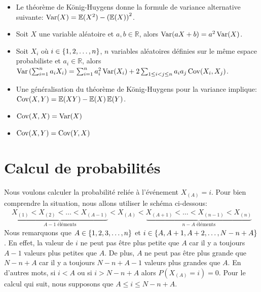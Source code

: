 \documentclass[10pt]{article}
\begin{document}
\begin{itemize}
\item
  Le théorème de König-Huygens donne la formule de variance alternative
  suivante: \(\operatorname{Var}(X)=\operatorname{\mathbb{E}}(X^2)-\left(\operatorname{\mathbb{E}}(X)\right)^2\).
\item
  Soit \(X\) une variable aléatoire et \(a,b\in\mathbb{R}\), alors
  \(\operatorname{Var}(aX+b)=a^2\operatorname{Var}(X)\).
\item
  Soit \(X_i\) où \(i\in\left\{1,2,\ldots,n\right\}\), \(n\) variables aléatoires
  définies sur le même espace probabiliste et \(a_i\in\mathbb{R}\),
  alors
  \(\operatorname{Var}\left(\sum_{i=1}^n a_iX_i\right)=\sum_{i=1}^n a_i^2\operatorname{Var}(X_i)+2\sum_{1\leq i< j\leq n} a_ia_j\operatorname{Cov}(X_i,X_j)\).
\item
  Une généralisation du théorème de König-Huygens pour la variance
  implique: \(\operatorname{Cov}(X,Y)=\operatorname{\mathbb{E}}(XY)-\operatorname{\mathbb{E}}(X)\operatorname{\mathbb{E}}(Y)\).
\item
  \(\operatorname{Cov}(X,X)=\operatorname{Var}(X)\)
\item
  \(\operatorname{Cov}(X,Y)=\operatorname{Cov}(Y,X)\)
\end{itemize}

\hypertarget{calcul-de-probabilites}{%
\section{\texorpdfstring{Calcul de probabilités
\label{calculs_proba}}{Calcul de probabilités }}\label{calcul-de-probabilites}}

Nous voulons calculer la probabilité reliée à l'événement \(X_{(A)}=i\).
Pour bien comprendre la situation, nous allons utiliser le schéma
ci-dessous: \begin{align*}
\underbrace{X_{(1)} <  X_{(2)} < \ldots < X_{(A-1)}}_{A-1 \text{ éléments}} 
< X_{(A)} 
< \underbrace{X_{(A+1)} < \ldots < X_{(n-1)} < X_{(n)}}_{n-A \text{ éléments}}
\end{align*} Nous remarquons que \(A\in\left\{1,2,3,\ldots, n\right\}\) et
\(i\in\left\{A,A+1,A+2,\ldots,N-n+A\right\}\). En effet, la valeur de \(i\) ne
peut pas être plus petite que \(A\) car il y a toujours \(A-1\) valeurs
plus petites que \(A\). De plus, \(A\) ne peut pas être plus grande que
\(N-n+A\) car il y a toujours \(N-n+A-1\) valeurs plus grandes que
\(A\). En d'autres mots, si \(i<A\) ou si \(i>N-n+A\) alors
\(P(X_{(A)}=i)=0\). Pour le calcul qui suit, nous supposons que
\(A \leq i \leq N-n+A\).
\end{document}
